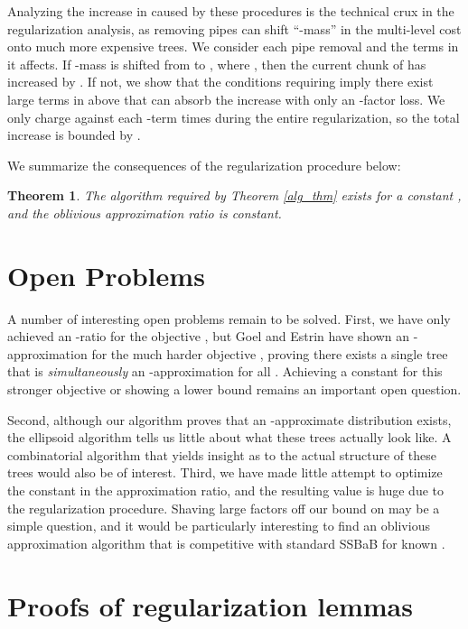 \documentclass[11pt]{article}
\newtheorem{thm}{Theorem}[section]
\begin{document}
Analyzing the increase in  caused by these procedures is the technical crux in the regularization analysis, as removing pipes can shift ``-mass'' in the multi-level cost onto much more expensive trees.  
We consider each pipe removal and the terms in  it affects.  If -mass is shifted from  to , where , then the current chunk of  has increased by .  If not, we show that the conditions requiring  imply there exist large terms in  above  that can absorb the increase with only an -factor loss.
We only charge against each -term  times during the entire regularization, so the total increase is bounded by .

We summarize the consequences of the regularization procedure below:

\begin{thm} The algorithm  required by Theorem \ref{alg_thm} exists for a constant , and the oblivious approximation ratio  is constant.
\end{thm}

\section{Open Problems}

A number of interesting open problems remain to be solved.  First, we have only achieved an -ratio for the objective , but Goel and Estrin \cite{goel2003soc} have shown an -approximation for the much harder objective , proving there exists a single tree that is \emph{simultaneously} an -approximation for all .  Achieving a constant for this stronger objective or showing a lower bound remains an important open question.  

Second, although our algorithm proves that an -approximate distribution exists, the ellipsoid algorithm tells us little about what these trees actually look like.  A combinatorial algorithm that yields insight as to the actual structure of these trees would also be of interest.  Third, we have made little attempt to optimize the constant  in the approximation ratio, and the resulting value is huge due to the regularization procedure.
Shaving large factors off our bound on  may be a simple question, and it would be particularly interesting to find an oblivious approximation algorithm that is competitive with standard SSBaB for known .




\appendix

\section{Proofs of regularization lemmas}
\label{regularization_appendix}
\end{document}
